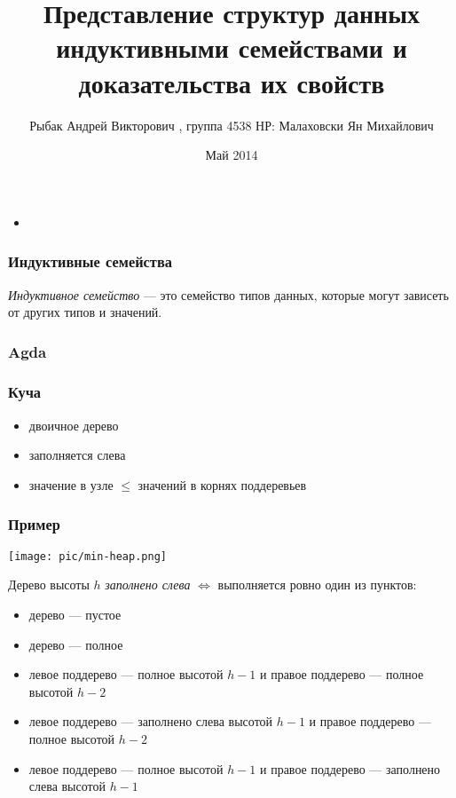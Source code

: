\documentclass{beamer}
\title[Представление структур данных индуктивными семействами и доказательства их свойств]{Представление структур данных индуктивными семействами и доказательства их свойств}
\institute{НИУ ИТМО}
\author[Рыбак А.В.]{Рыбак Андрей Викторович , группа 4538
\newline НР: Малаховски Ян Михайлович}
\date{
Май 2014
}
\begin{document}
\maketitle

\begin{frame}
    \frametitle{}
    \begin{itemize}
        \item 
    \end{itemize}
\end{frame}
\begin{frame}
    \frametitle{Индуктивные семейства}
        \emph{Индуктивное семейство} — это семейство типов данных,
        которые могут зависеть от других типов и значений.
\end{frame}

\begin{frame}
    \frametitle{Agda}
    
\end{frame}

\begin{frame}
    \frametitle{Куча}
    \begin{itemize}
        \item двоичное дерево
        \item заполняется слева
        \item значение в узле $ \leq $ значений в корнях поддеревьев
    \end{itemize}
\end{frame}
\begin{frame}
    \frametitle{Пример}
    \texttt{[image: pic/min-heap.png]}
\end{frame}
\begin{frame}
Дерево высоты $h$ \emph{заполнено слева} $ \iff $
выполняется ровно один из пунктов:
  \begin{itemize}
    \item дерево — пустое
    \item дерево — полное
    \item левое поддерево — полное высотой $h-1$ и правое поддерево — полное высотой $h-2$
    \item левое поддерево — заполнено слева высотой $h-1$ и правое поддерево — полное высотой $h-2$
    \item левое поддерево — полное высотой $h-1$ и правое поддерево — заполнено слева высотой $h-1$
  \end{itemize}

\end{frame}
\begin{frame}
    
\end{frame}
\end{document}
